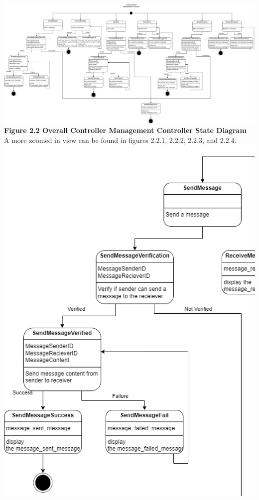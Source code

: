 \documentclass[]{article}
\begin{document}
\begin{center}
	\includegraphics[width=\textwidth]{../images/ControllerStateDiagrams/CommunicationManagementController.drawio.png}
	\textbf{Figure 2.2 Overall Controller Management Controller State Diagram}
	\\A more zoomed in view can be found in figures 2.2.1, 2.2.2, 2.2.3, and 2.2.4.
	\includegraphics{../images/ControllerStateDiagrams/CMC1.png}\\

\end{center}
\end{document}
